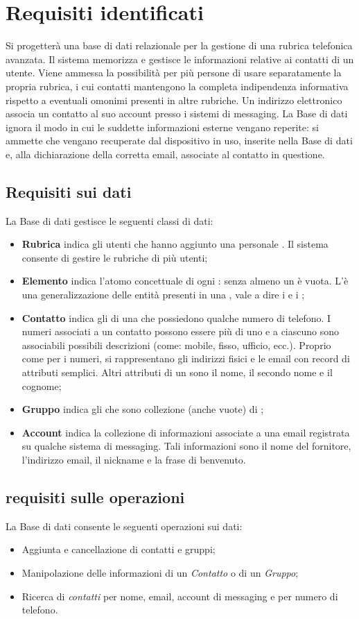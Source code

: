 \chapter{Requisiti identificati}
Si progetterà una base di dati relazionale per la gestione di una rubrica telefonica avanzata. Il sistema memorizza e gestisce le informazioni relative ai contatti di un utente. Viene ammessa la possibilità per più persone di usare separatamente la propria rubrica, i cui contatti mantengono la completa indipendenza informativa rispetto a eventuali omonimi presenti in altre rubriche. Un indirizzo elettronico associa un contatto al suo account presso i sistemi di messaging. La Base di dati ignora il modo in cui le suddette informazioni esterne vengano reperite: si ammette che vengano recuperate dal dispositivo in uso, inserite nella Base di dati e, alla dichiarazione della corretta email, associate al contatto in questione. 
\section{Requisiti sui dati}
La Base di dati gestisce le seguenti classi di dati: 
\begin{itemize}
\item 
\textbf{Rubrica} indica gli utenti che hanno aggiunto una personale \rubrica. Il sistema consente di gestire le rubriche di più utenti;
\item 
\textbf{Elemento} indica l'atomo concettuale di ogni \Rubrica: senza almeno un \elemento è vuota. L'\elemento è una generalizzazione delle entità presenti in una \Rubrica, vale a dire i \contatti e i \gruppi;
\item 
\textbf{Contatto} indica gli \elementi di una \Rubrica che possiedono qualche numero di telefono. I numeri associati a un contatto possono essere più di uno e a ciascuno sono associabili possibili descrizioni (come: mobile, fisso, ufficio, ecc.). Proprio come per i numeri, si rappresentano gli indirizzi fisici e le email con record di attributi semplici. Altri attributi di un \contatto sono il nome, il secondo nome e il cognome;
\item 
\textbf{Gruppo} indica gli \elementi che sono collezione (anche vuote) di \contatti;
\item 
\textbf{Account} indica la collezione di informazioni associate a una email registrata su qualche sistema di messaging. Tali informazioni sono il nome del fornitore, l'indirizzo email, il nickname e la frase di benvenuto.
\end{itemize}

\section{requisiti sulle operazioni}
La Base di dati consente le seguenti operazioni sui dati:
\begin{itemize}
\item
Aggiunta e cancellazione di contatti e gruppi;
\item
Manipolazione delle informazioni di un \emph{Contatto} o di un \emph{Gruppo}; 
\item
Ricerca di \emph{contatti} per nome, email, account di messaging e per numero di telefono.
\end{itemize}